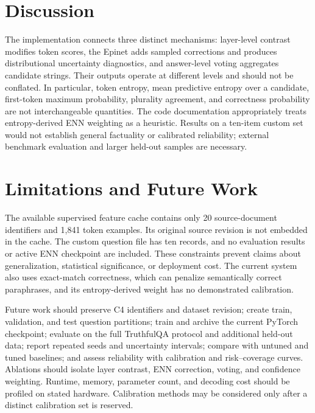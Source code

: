 \documentclass[conference]{IEEEtran}
\begin{document}
\section{Discussion}
The implementation connects three distinct mechanisms: layer-level contrast modifies token scores, the Epinet adds sampled corrections and produces distributional uncertainty diagnostics, and answer-level voting aggregates candidate strings. Their outputs operate at different levels and should not be conflated. In particular, token entropy, mean predictive entropy over a candidate, first-token maximum probability, plurality agreement, and correctness probability are not interchangeable quantities. The code documentation appropriately treats entropy-derived ENN weighting as a heuristic. Results on a ten-item custom set would not establish general factuality or calibrated reliability; external benchmark evaluation and larger held-out samples are necessary.

\section{Limitations and Future Work}
The available supervised feature cache contains only 20 source-document identifiers and 1,841 token examples. Its original source revision is not embedded in the cache. The custom question file has ten records, and no evaluation results or active ENN checkpoint are included. These constraints prevent claims about generalization, statistical significance, or deployment cost. The current system also uses exact-match correctness, which can penalize semantically correct paraphrases, and its entropy-derived weight has no demonstrated calibration.

Future work should preserve C4 identifiers and dataset revision; create train, validation, and test question partitions; train and archive the current PyTorch checkpoint; evaluate on the full TruthfulQA protocol and additional held-out data; report repeated seeds and uncertainty intervals; compare with untuned and tuned baselines; and assess reliability with calibration and risk--coverage curves. Ablations should isolate layer contrast, ENN correction, voting, and confidence weighting. Runtime, memory, parameter count, and decoding cost should be profiled on stated hardware. Calibration methods may be considered only after a distinct calibration set is reserved.
\end{document}
